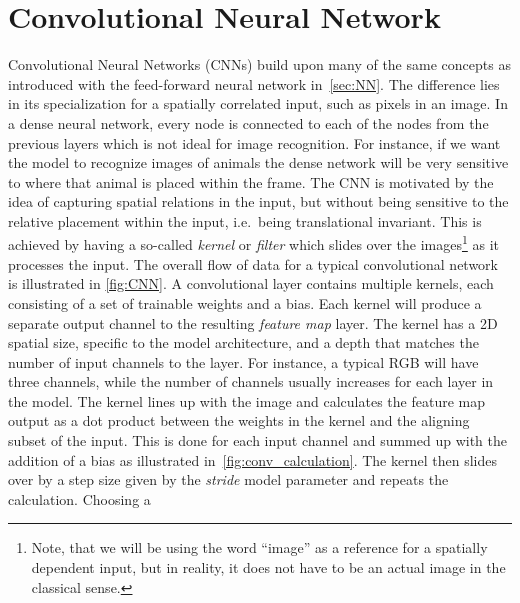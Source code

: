 \section{Convolutional Neural Network}\label{sec:CNN}


Convolutional Neural Networks (\acrshort{CNN}s) build upon many of the same
concepts as introduced with the feed-forward neural network in~\cref{sec:NN}.
The difference lies in its specialization for a spatially correlated input, such
as pixels in an image. In a dense neural network, every node is connected to
each of the nodes from the previous layers which is not ideal for image
recognition. For instance, if we want the model to recognize images of animals
the dense network will be very sensitive to where that animal is placed within
the frame. The \acrshort{CNN} is motivated by the idea of capturing spatial
relations in the input, but without being sensitive to the relative placement
within the input, i.e.\ being translational invariant. This is achieved by
having a so-called \textit{kernel} or \textit{filter} which slides over the
images\footnote{Note, that we will be using the word ``image'' as a reference
for a spatially dependent input, but in reality, it does not have to be an
actual image in the classical sense.} as it processes the input. The overall flow of data for a typical convolutional network is illustrated in \cref{fig:CNN}. A convolutional layer contains multiple kernels, each consisting of a set of trainable weights
and a bias. Each kernel will produce a separate output channel to the resulting
\textit{feature map} layer. The kernel has a 2D spatial size, specific to the
model architecture, and a depth that matches the number of input channels to the
layer. For instance, a typical RGB will have three channels, while the number of
channels usually increases for each layer in the model. The kernel lines up with
the image and calculates the feature map output as a dot product between the
weights in the kernel and the aligning subset of the input. This is done for
each input channel and summed up with the addition of a bias as illustrated
in~\cref{fig:conv_calculation}. The kernel then slides over by a step size given
by the \textit{stride} model parameter and repeats the calculation. Choosing a
